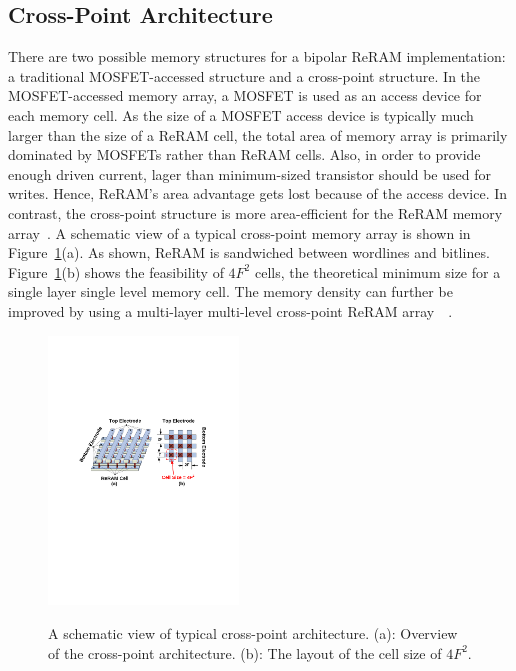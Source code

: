 \subsection{Cross-Point Architecture}
There are two possible memory structures for a bipolar ReRAM
implementation: a traditional MOSFET-accessed structure and a cross-point
structure. In the MOSFET-accessed memory array, a MOSFET is used as an
access device for each memory cell. As the size of a MOSFET access device
is typically much larger than the size of a ReRAM cell, the total area of
memory array is primarily dominated by MOSFETs rather than ReRAM cells.
Also, in order to provide enough driven current, lager than minimum-sized
transistor should be used for writes. Hence, ReRAM's area advantage gets
lost because of the access device.
In contrast, the cross-point structure is more area-efficient for the
ReRAM memory array~\cite{memristor:Cong}. A schematic view of a typical
cross-point memory array is shown in Figure~\ref{fig:array}(a). As shown, ReRAM is sandwiched between wordlines and bitlines.
Figure~\ref{fig:array}(b) shows the feasibility of $4F^2$ cells, the
theoretical minimum size for a single layer single level memory cell. The
memory density can further be improved by using a multi-layer multi-level
cross-point ReRAM
array~\cite{crossbar_unity}~\cite{memristor:IEDM08_3D}.

\begin{figure}
\centering
  \includegraphics[width=0.45\textwidth]{./figures/crossbar_array2.pdf}\\\vspace{-10pt}
  \caption{A schematic view of typical cross-point architecture. (a): Overview of the cross-point architecture. (b): The layout of the cell size of $4F^2$. }\label{fig:array}
\vspace{-12pt}
\end{figure}

